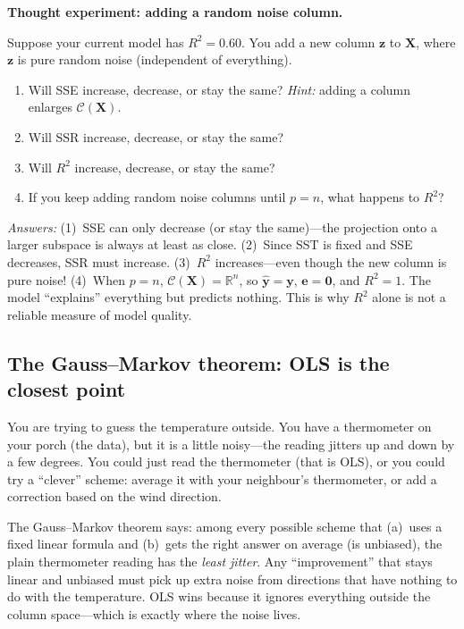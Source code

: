 \documentclass[11pt,a4paper]{article}
\theoremstyle{plain}
\theoremstyle{definition}
\newcommand{\R}{\mathbb{R}}
\newcommand{\yhat}{\hat{\bm{y}}}
\newcommand{\bX}{\bm{X}}
\newcommand{\by}{\bm{y}}
\newcommand{\be}{\bm{e}}
\newcommand{\Col}{\mathcal{C}}
\begin{document}
\begin{stopandthink}
\textbf{Thought experiment: adding a random noise column.}

Suppose your current model has $R^2 = 0.60$.
You add a new column $\bm{z}$ to $\bX$, where $\bm{z}$ is pure random noise
(independent of everything).
\begin{enumerate}[nosep]
  \item Will SSE increase, decrease, or stay the same?
        \emph{Hint:} adding a column enlarges $\Col(\bX)$.
  \item Will SSR increase, decrease, or stay the same?
  \item Will $R^2$ increase, decrease, or stay the same?
  \item If you keep adding random noise columns until $p = n$,
        what happens to $R^2$?
\end{enumerate}
\emph{Answers:}
(1)~SSE can only decrease (or stay the same)---the projection onto a
larger subspace is always at least as close.
(2)~Since SST is fixed and SSE decreases, SSR must increase.
(3)~$R^2$ increases---even though the new column is pure noise!
(4)~When $p = n$, $\Col(\bX) = \R^n$, so $\yhat = \by$, $\be = \bm{0}$,
and $R^2 = 1$. The model ``explains'' everything but predicts nothing.
This is why $R^2$ alone is not a reliable measure of model quality.
\end{stopandthink}


\subsection{The Gauss--Markov theorem: OLS is the closest point}

\begin{toystory}
You are trying to guess the temperature outside.  You have a thermometer
on your porch (the data), but it is a little noisy---the reading jitters
up and down by a few degrees.  You could just read the thermometer
(that is OLS), or you could try a ``clever'' scheme: average it with
your neighbour's thermometer, or add a correction based on the wind
direction.

The Gauss--Markov theorem says: among every possible scheme that
(a)~uses a fixed linear formula and (b)~gets the right answer on
average (is unbiased), the plain thermometer reading has the
\emph{least jitter}.  Any ``improvement'' that stays linear and unbiased
must pick up extra noise from directions that have nothing to do with
the temperature.  OLS wins because it ignores everything outside the
column space---which is exactly where the noise lives.
\end{toystory}
\end{document}
